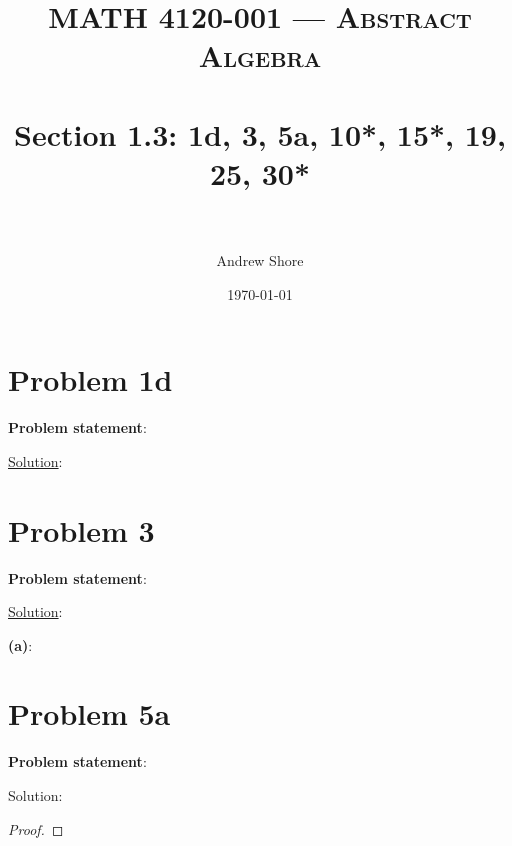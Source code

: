 \documentclass{article} %
\title{ 
\normalfont \normalsize 
\textsc{MATH 4120-001 --- Abstract Algebra} \\
\horrule{0.5pt} \\[0cm] %
\huge Section 1.3: 1d, 3, 5a, 10*, 15*, 19, 25, 30*  \\ %
\horrule{2pt} \\[0cm] %
}
\author{Andrew Shore} %
\date{\normalsize\today} %
\begin{document}
\maketitle %

\section*{Problem 1d}


\textbf{Problem statement}: 

\underline{Solution}: 
\begin{addmargin}[1em]{0em}

\end{addmargin}    

\newpage

\section*{Problem 3}

\textbf{Problem statement}: 


\underline{Solution}: 
\begin{addmargin}[1em]{0em}
\textbf{(a)}:
\begin{addmargin}[1em]{0em}
\end{addmargin}
\end{addmargin}

\newpage

\section*{Problem 5a}


\textbf{Problem statement}: 

Solution: 
\begin{addmargin}[1em]{0em}
\begin{proof}

\end{proof}
\end{addmargin}

\newpage
\end{document}
